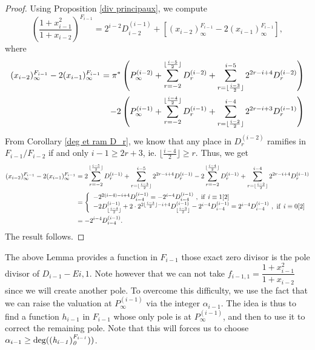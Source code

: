 \documentclass[10pt]{article}
\begin{document}
\begin{proof}
Using Proposition \ref{div principaux}, we compute
\[\left(\dfrac{1+x_{i-1}^2}{1+x_{i-2}}\right)^{F_{i-1}}  = 2^{i-2}D_{i-2}^{(i-1)} + \left[(x_{i-2})^{F_{i-1}}_{\infty} - 2(x_{i-1})^{F_{i-1}}_{\infty}\right],\]
where 
\begin{align*} \null  (x_{i-2})^{F_{i-1}}_{\infty} - 2(x_{i-1})^{F_{i-1}}_{\infty}  = \pi^*\left(P_{\infty}^{(i-2)} + \sum\limits_{r=-2}^{\lfloor \frac{i-5}{2}\rfloor} D_r^{(i-2)} + \sum\limits_{r=\lfloor \frac{i-3}{2}\rfloor}^{i-5} 2^{2r-i+4}D_r^{(i-2)}\right) & \\ - 2 \left( P_{\infty}^{(i-1)} + \sum\limits_{r=-2}^{\lfloor \frac{i-4}{2}\rfloor} D_r^{(i-1)} + \sum\limits_{r=\lfloor \frac{i-2}{2}\rfloor}^{i-4} 2^{2r-i+3}D_r^{(i-1)}\right)
\end{align*}
From Corollary \ref{deg et ram D_r}, we know that any place in $D_r^{(i-2)}$ ramifies in $F_{i-1}/F_{i-2}$ if and only $i-1 \geq 2r+3$, ie. $\lfloor \frac{i-4}{2}\rfloor \geq r$. Thus, we get
\begin{align*}
(x_{i-2})^{F_{i-1}}_{\infty} - 2(x_{i-1})^{F_{i-1}}_{\infty} &= 
2\sum\limits_{r=-2}^{\lfloor \frac{i-5}{2}\rfloor} D_r^{(i-1)} + \sum\limits_{r=\lfloor \frac{i-3}{2}\rfloor}^{i-5} 2^{2r-i+4}D_r^{(i-1)} - 2\sum\limits_{r=-2}^{\lfloor \frac{i-4}{2}\rfloor} D_r^{(i-1)} + \sum\limits_{r=\lfloor \frac{i-2}{2}\rfloor}^{i-4} 2^{2r-i+4}D_r^{(i-1)} \\
&= \left\{ \begin{array}{ll}
-2^{2(i-4)-i+4}D_{i-4}^{(i-1)} = -2^{i-4}D_{i-4}^{(i-1)} \ , \ \rm if \ \it i \equiv \rm 1[2] \\
-2D_{\lfloor \frac{i-4}{2}\rfloor}^{(i-1)} + 2 \cd 2^{2\lfloor \frac{i-3}{2} \rfloor -i+4} D_{\lfloor \frac{i-3}{2} \rfloor}^{(i-1)} - 2^{i-4}D_{i-4}^{(i-1)} = 2^{i-4}D_{i-4}^{(i-1)} \ , \ \rm if \ \it i \equiv \rm 0[2]
\end{array}
\right. \\
&= -2^{i-4}D_{i-4}^{(i-1)}.
\end{align*}
The result follows.
\end{proof}

\s

The above Lemma provides a function in $F_{i-1}$ those exact zero divisor is the pole divisor of $D_{i-1}-E{i,1}$. Note however that we can not take $f_{i-1,1} = \dfrac{1+x_{i-1}^2}{1+x_{i-2}}$ since we will create another pole. To overcome this difficulty, we use the fact that we can raise the valuation at $P_{\infty}^{(i-1)}$ via the integer $\alpha_{i-1}$. The idea is thus to find a function $h_{i-1}$ in $F_{i-1}$ whose only pole is at $P_{\infty}^{(i-1)}$, and then to use it to correct the remaining pole. Note that this will forces us to choose $\alpha_{i-1} \geq \rm deg \it ((h_{i-1})^{F_{i-1}}_0))$.
\end{document}
